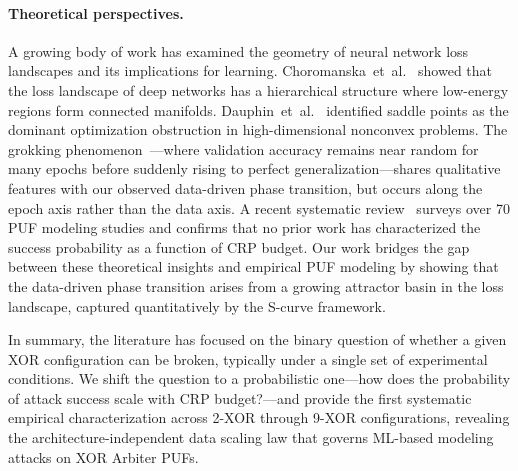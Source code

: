 \paragraph{Theoretical perspectives.}
A growing body of work has examined the geometry of neural network loss
landscapes and its implications for learning.  Choromanska~et~al.~\cite{choromanska2015loss}
showed that the loss landscape of deep networks has a hierarchical structure
where low-energy regions form connected manifolds.  Dauphin~et~al.~\cite{dauphin2014identifying}
identified saddle points as the dominant optimization obstruction in
high-dimensional nonconvex problems.  The grokking
phenomenon~\cite{power2022grokking}---where validation accuracy remains near
random for many epochs before suddenly rising to perfect
generalization---shares qualitative features with our observed data-driven
phase transition, but occurs along the epoch axis rather than the data axis.
A recent systematic review~\cite{pufmodeling2026systematic} surveys over 70
PUF modeling studies and confirms that no prior work has characterized the
success probability as a function of CRP budget.  Our work bridges the gap
between these theoretical insights and empirical PUF modeling by showing that
the data-driven phase transition arises from a growing attractor basin in the
loss landscape, captured quantitatively by the S-curve framework.

In summary, the literature has focused on the binary question of whether a
given XOR configuration can be broken, typically under a single set of
experimental conditions.  We shift the question to a probabilistic one---how
does the probability of attack success scale with CRP budget?---and provide
the first systematic empirical characterization across 2-XOR through 9-XOR
configurations, revealing the architecture-independent data scaling law that
governs ML-based modeling attacks on XOR Arbiter PUFs.


